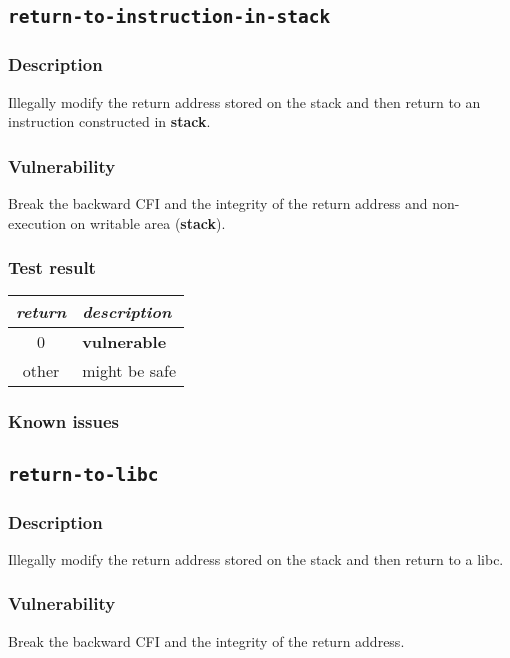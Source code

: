 \documentclass[a4paper]{book}
\begin{document}
\newpage
\subsection{\texttt{return-to-instruction-in-stack}}\label{test-return-to-instruction-in-stack}

\subsubsection{Description}
Illegally modify the return address stored on the stack and then return to  an instruction constructed in \textbf{stack}.

\subsubsection{Vulnerability}
Break the backward CFI and the integrity of the return address and non-execution on writable area (\textbf{stack}).

\subsubsection{Test result}
\begin{tabular}{cl}
  \toprule
  \emph{return}  & \emph{description} \\
  \midrule
  0              & \textbf{vulnerable} \\
  other          & might be safe \\
  \bottomrule
\end{tabular}
  
\subsubsection{Known issues}
\newpage
\subsection{\texttt{return-to-libc}}\label{test-return-to-libc}

\subsubsection{Description}
Illegally modify the return address stored on the stack and then return to a libc.

\subsubsection{Vulnerability}
Break the backward CFI and the integrity of the return address.
\end{document}
